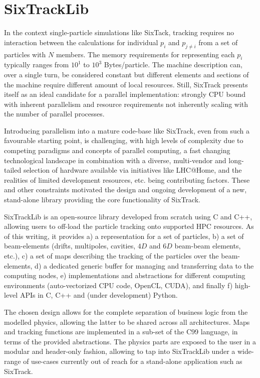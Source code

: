 \documentclass[a4paper,
              ]{jacow}
\begin{document}
\section{SixTrackLib}
In the context single-particle simulations like SixTack, tracking requires no interaction between the calculations for individual $p_i$ and $p_{j\neq i}$ from a set of particles with $N$ members. The memory requirements for representing each $p_i$ typically ranges from $10^1$ to $10^3$ Bytes/particle. The machine description can, over a single turn, be considered constant but different elements and sections of the machine require different amount of local resources. Still,  SixTrack presents itself as an ideal candidate for a parallel implementation: strongly CPU bound with inherent parallelism and resource requirements not inherently scaling with the number of parallel processes. 

Introducing parallelism into a mature code-base like SixTrack, even from such a favourable starting point, is challenging, with high levels of complexity due to competing paradigms and concepts of parallel computing, a fast changing technological landscape in combination with a diverse, multi-vendor and long-tailed selection of hardware available via initiatives like  LHC@Home\cite{lhcathome}, and the realities of limited development resources, etc. being contributing factors. These and other constraints motivated the design and ongoing development of a new, stand-alone library providing the core functionality of SixTrack. 

SixTrackLib\cite{sixtracklib} is an open-source library developed from scratch using C and C++, allowing
users to off-load the particle tracking onto supported HPC resources. As of this writing, it provides
a) a representation for a set of particles, 
b) a set of beam-elements (drifts, multipoles, cavities, $4D$ and $6D$ beam-beam elements, etc.),
c) a set of maps describing the tracking of the particles over the beam-elements, 
d) a dedicated generic buffer for managing and transferring data to the computing nodes, 
e) implementations and abstractions for different computing environments (auto-vectorized CPU code, OpenCL\cite{opencl}, CUDA\cite{cuda}), and finally
f) high-level APIs in C, C++ and (under development) Python.

The chosen design allows for the complete separation of business logic  from the modelled physics, allowing the latter to be shared across all architectures. Maps and tracking functions are implemented in a sub-set of the C99 language, in terms of the provided abstractions. The physics parts are exposed to the user in a modular and header-only fashion, allowing to tap into SixTrackLib under a wide-range of use-cases currently out of reach for a stand-alone application such as SixTrack.
\end{document}

